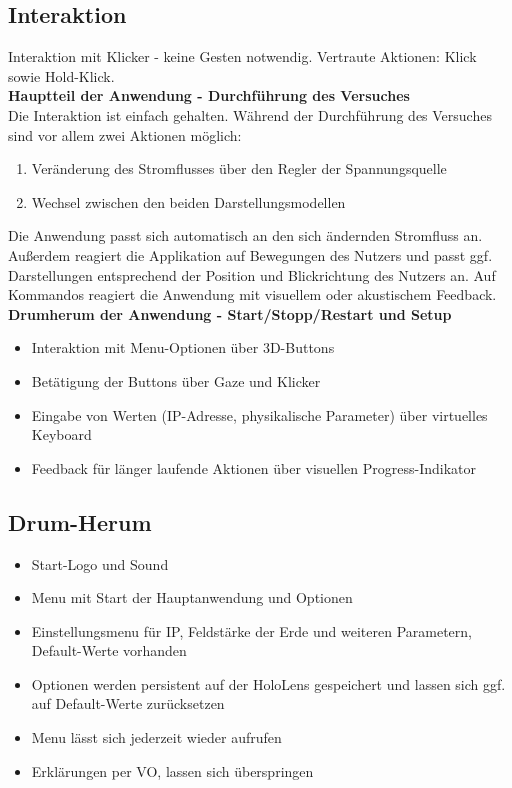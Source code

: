 \subsection{Interaktion}
Interaktion mit Klicker - keine Gesten notwendig. Vertraute Aktionen: Klick sowie Hold-Klick.\\
\textbf{Hauptteil der Anwendung - Durchführung des Versuches}\\
Die Interaktion ist einfach gehalten. Während der Durchführung des Versuches sind vor allem zwei Aktionen möglich:
\begin{enumerate}[topsep=-2px]
	\setlength{\itemsep}{-5pt}
	\item Veränderung des Stromflusses über den Regler der Spannungsquelle
	\item Wechsel zwischen den beiden Darstellungsmodellen
\end{enumerate}
\vspace{4px}

Die Anwendung passt sich automatisch an den sich ändernden Stromfluss an. Außerdem reagiert die Applikation auf Bewegungen des Nutzers und passt ggf. Darstellungen entsprechend der Position und Blickrichtung des Nutzers an. Auf Kommandos reagiert die Anwendung mit visuellem oder akustischem Feedback.\\[4px]

\textbf{Drumherum der Anwendung - Start/Stopp/Restart und Setup}
\begin{itemize}[topsep=-2px]
	\setlength{\itemsep}{-5pt}
	\item Interaktion mit Menu-Optionen über 3D-Buttons
	\item Betätigung der Buttons über Gaze und Klicker
	\item Eingabe von Werten (IP-Adresse, physikalische Parameter) über virtuelles Keyboard
	\item Feedback für länger laufende Aktionen über visuellen Progress-Indikator
\end{itemize}

\subsection{Drum-Herum}
\begin{itemize}[topsep=-2px]
	\setlength{\itemsep}{-5pt}
	\item Start-Logo und Sound
	\item Menu mit Start der Hauptanwendung und Optionen
	\item Einstellungsmenu für IP, Feldstärke der Erde und weiteren Parametern, Default-Werte vorhanden
	\item Optionen werden persistent auf der HoloLens gespeichert und lassen sich ggf. auf Default-Werte zurücksetzen
	\item Menu lässt sich jederzeit wieder aufrufen
	\item Erklärungen per VO, lassen sich überspringen
\end{itemize}

